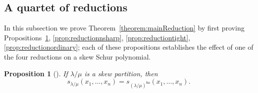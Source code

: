 \documentclass[10pt]{article}
\newtheorem{prop}[theorem]{Proposition}
\theoremstyle{definition}
\newcommand{\ba}{\mathsf{ba}}
\begin{document}
\subsection{A quartet of reductions}\label{subsec:treductions} In this subsection we prove Theorem~\ref{theorem:mainReduction} by first proving Propositions~\ref{prop:reductionbasic}, \ref{prop:reductionnsharp}, \ref{prop:reductiontight}, \ref{prop:reductionordinary}; each of these propositions establishes the effect of one of the four reductions on a skew Schur polynomial. 

\begin{prop}[{\cite[Lemma 2]{TY10}}]
\label{prop:reductionbasic}
If $\lambda / \mu$ is a skew partition, then 
\[s_{\lambda / \mu}(x_1,\ldots,x_n) = s_{(\lambda / \mu)^\ba }(x_1,\ldots,x_n).
\]
\end{prop}
\end{document}
